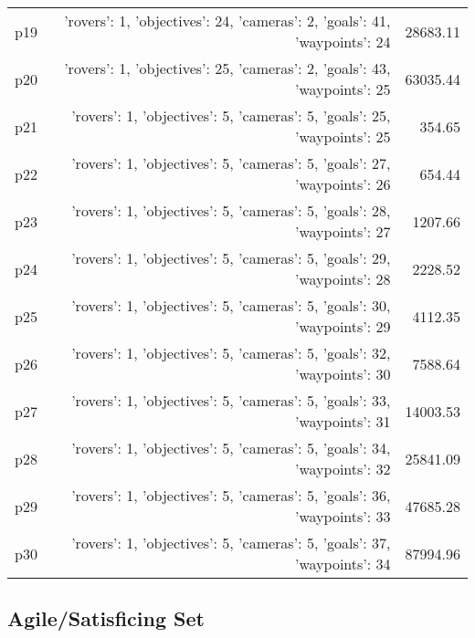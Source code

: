 \documentclass{article}
\begin{document}
\begin{center}
\begin{tabular}{@{}l|r|r@{}}
  p19&{'rovers': 1, 'objectives': 24, 'cameras': 2, 'goals': 41, 'waypoints': 24}&28683.11\\
  p20&{'rovers': 1, 'objectives': 25, 'cameras': 2, 'goals': 43, 'waypoints': 25}&63035.44\\
  p21&{'rovers': 1, 'objectives': 5, 'cameras': 5, 'goals': 25, 'waypoints': 25}&354.65\\
  p22&{'rovers': 1, 'objectives': 5, 'cameras': 5, 'goals': 27, 'waypoints': 26}&654.44\\
  p23&{'rovers': 1, 'objectives': 5, 'cameras': 5, 'goals': 28, 'waypoints': 27}&1207.66\\
  p24&{'rovers': 1, 'objectives': 5, 'cameras': 5, 'goals': 29, 'waypoints': 28}&2228.52\\
  p25&{'rovers': 1, 'objectives': 5, 'cameras': 5, 'goals': 30, 'waypoints': 29}&4112.35\\
  p26&{'rovers': 1, 'objectives': 5, 'cameras': 5, 'goals': 32, 'waypoints': 30}&7588.64\\
  p27&{'rovers': 1, 'objectives': 5, 'cameras': 5, 'goals': 33, 'waypoints': 31}&14003.53\\
  p28&{'rovers': 1, 'objectives': 5, 'cameras': 5, 'goals': 34, 'waypoints': 32}&25841.09\\
  p29&{'rovers': 1, 'objectives': 5, 'cameras': 5, 'goals': 36, 'waypoints': 33}&47685.28\\
  p30&{'rovers': 1, 'objectives': 5, 'cameras': 5, 'goals': 37, 'waypoints': 34}&87994.96
                            \end{tabular}
                            \end{center}
                    

                                \subsection*{Agile/Satisficing Set}
                                
\end{document}
